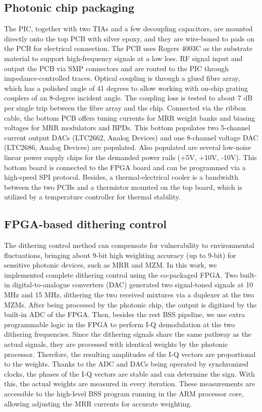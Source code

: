 \documentclass[pdflatex,mathphys]{sty}%
\begin{document}
\subsection{Photonic chip packaging}
The PIC, together with two TIAs and a few decoupling capacitors, are mounted directly onto the top PCB with silver epoxy, and they are wire-boned to pads on the PCB for electrical connection. The PCB uses Rogers 4003C as the substrate material to support high-frequency signals at a low loss. RF signal input and output the PCB via SMP connectors and are routed to the PIC through impedance-controlled traces. Optical coupling is through a glued fibre array, which has a polished angle of 41 degrees to allow working with on-chip grating couplers of an 8-degree incident angle. The coupling loss is tested to about 7 dB per single trip between the fibre array and the chip. Connected via the ribbon cable, the bottom PCB offers tuning currents for MRR weight banks and biasing voltages for MRR modulators and BPDs. This bottom populates two 5-channel current output DACs (LTC2662, Analog Devices) and one 8-channel voltage DAC (LTC2686, Analog Devices) are populated. Also populated are several low-noise linear power supply chips for the demanded power rails (+5V, +10V, -10V). This bottom board is connected to the FPGA board and can be programmed via a high-speed SPI protocol. Besides, a thermal-electrical cooler is a bandwidth between the two PCBs and a thermistor mounted on the top board, which is utilized by a temperature controller for thermal stability.


\subsection{FPGA-based dithering control}
The dithering control method can compensate for vulnerability to environmental fluctuations, bringing about 9-bit high weighting accuracy (up to 9-bit) for sensitive photonic devices, such as MRR and MZM. In this work, we implemented complete dithering control using the co-packaged FPGA. Two built-in digital-to-analogue converters (DAC) generated two signal-toned signals at 10 MHz and 15 MHz, dithering the two received mixtures via a duplexer at the two MZMs. After being processed by the photonic chip, the output is digitized by the built-in ADC of the FPGA. Then, besides the rest BSS pipeline, we use extra programmable logic in the FPGA to perform I-Q demodulation at the two dithering frequencies. Since the dithering signals share the same pathway as the actual signals, they are processed with identical weights by the photonic processor. Therefore, the resulting amplitudes of the I-Q vectors are proportional to the weights. Thanks to the ADC and DACs being operated by synchronized clocks, the phases of the I-Q vectors are stable and can determine the sign. With this, the actual weights are measured in every iteration. These measurements are accessible to the high-level BSS program running in the ARM processor core, allowing adjusting the MRR currents for accurate weighting.
\end{document}
